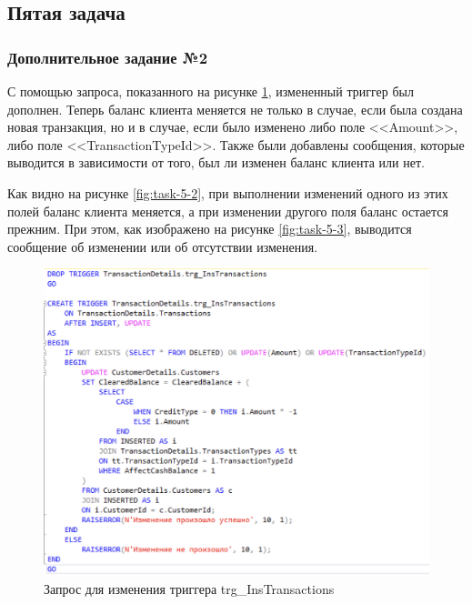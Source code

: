 \documentclass[a4paper, 14pt]{extarticle}
\begin{document}
\newpage

\subsection{Пятая задача}

\subsubsection{Дополнительное задание №2}

С помощью запроса, показанного на рисунке \ref{fig:task-5-1}, измененный триггер
был дополнен. Теперь баланс клиента меняется не только в случае, если была
создана новая транзакция, но и в случае, если было изменено либо поле
<<\foreignlanguage{english}{Amount}>>, либо поле
<<\foreignlanguage{english}{TransactionTypeId}>>. Также были добавлены
сообщения, которые выводится в зависимости от того, был ли изменен баланс
клиента или нет.

Как видно на рисунке \ref{fig:task-5-2}, при выполнении изменений одного из этих
полей баланс клиента меняется, а при изменении другого поля баланс остается
прежним. При этом, как изображено на рисунке \ref{fig:task-5-3}, выводится
сообщение об изменении или об отсутствии изменения.

\begin{figure}[H]
  \centering
  \includegraphics[width=\textwidth]{images/task-5/1.png}
  \caption{
    Запрос для изменения триггера
    \foreignlanguage{english}{trg\_InsTransactions}
  }
  \label{fig:task-5-1}
\end{figure}
\end{document}
